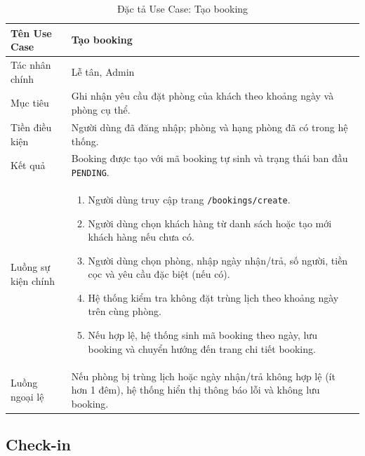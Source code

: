 \documentclass[13pt,a4paper]{extreport}
\begin{document}
\begin{table}[H]
\centering
\caption{Đặc tả Use Case: Tạo booking}
\label{tab:uc-booking}
\begin{tabular}{p{4cm}p{10cm}}
\hline
Tên Use Case & Tạo booking\\
\hline
Tác nhân chính & Lễ tân, Admin\\
Mục tiêu & Ghi nhận yêu cầu đặt phòng của khách theo khoảng ngày và phòng cụ thể.\\
Tiền điều kiện & Người dùng đã đăng nhập; phòng và hạng phòng đã có trong hệ thống.\\
Kết quả & Booking được tạo với mã booking tự sinh và trạng thái ban đầu \texttt{PENDING}.\\
\hline
Luồng sự kiện chính &
\begin{enumerate}
  \item Người dùng truy cập trang \texttt{/bookings/create}.
  \item Người dùng chọn khách hàng từ danh sách hoặc tạo mới khách hàng nếu chưa có.
  \item Người dùng chọn phòng, nhập ngày nhận/trả, số người, tiền cọc và yêu cầu đặc biệt (nếu có).
  \item Hệ thống kiểm tra không đặt trùng lịch theo khoảng ngày trên cùng phòng.
  \item Nếu hợp lệ, hệ thống sinh mã booking theo ngày, lưu booking và chuyển hướng đến trang chi tiết booking.
\end{enumerate}\\
\hline
Luồng ngoại lệ &
Nếu phòng bị trùng lịch hoặc ngày nhận/trả không hợp lệ (ít hơn 1 đêm), hệ thống hiển thị thông báo lỗi và không lưu booking.\\
\hline
\end{tabular}
\end{table}

\subsection*{Check-in}
\end{document}
